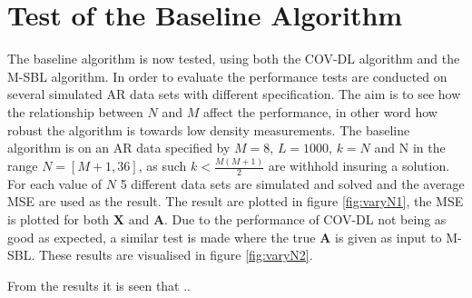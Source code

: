 \section{Test of the Baseline Algorithm}
The baseline algorithm is now tested, using both the COV-DL algorithm and the M-SBL algorithm. In order to evaluate the performance tests are conducted on several simulated AR data sets with different specification. The aim is to see how the relationship between $N$ and $M$ affect the performance, in other word how robust the algorithm is towards low density measurements. 
The baseline algorithm is on an AR data specified by $M=8$, $L=1000$, $k=N$ and N in the range $N = [M+1, 36]$, as such $k<\frac{M(M+1)}{2}$ are withhold insuring a solution.
For each value of $N$ 5 different data sets are simulated and solved and the average MSE are used as the result. The result are plotted in figure \ref{fig:varyN1}, the MSE is plotted for both $\textbf{X}$ and $\textbf{A}$. 
Due to the performance of COV-DL not being as good as expected, a similar test is made where the true $\textbf{A}$ is given as input to M-SBL. These results are visualised in figure \ref{fig:varyN2}.    
%      

From the results it is seen that .. 


